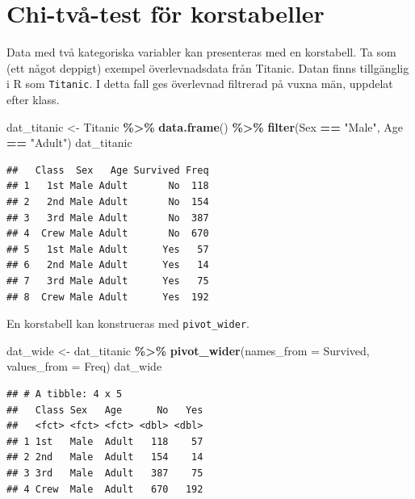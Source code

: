 \documentclass[
]{book}
\newenvironment{Shaded}{\begin{snugshade}}{\end{snugshade}}
\newcommand{\AttributeTok}[1]{\textcolor[rgb]{0.13,0.29,0.53}{#1}}
\newcommand{\FunctionTok}[1]{\textcolor[rgb]{0.13,0.29,0.53}{\textbf{#1}}}
\newcommand{\NormalTok}[1]{#1}
\newcommand{\OtherTok}[1]{\textcolor[rgb]{0.56,0.35,0.01}{#1}}
\newcommand{\SpecialCharTok}[1]{\textcolor[rgb]{0.81,0.36,0.00}{\textbf{#1}}}
\newcommand{\StringTok}[1]{\textcolor[rgb]{0.31,0.60,0.02}{#1}}
\theoremstyle{definition}
\theoremstyle{definition}
\theoremstyle{definition}
\theoremstyle{definition}
\theoremstyle{remark}
\begin{document}
\section{Chi-två-test för korstabeller}\label{chi-tvuxe5-test-fuxf6r-korstabeller}

Data med två kategoriska variabler kan presenteras med en korstabell. Ta som (ett något deppigt) exempel överlevnadsdata från Titanic. Datan finns tillgänglig i R som \texttt{Titanic}. I detta fall ges överlevnad filtrerad på vuxna män, uppdelat efter klass.

\begin{Shaded}
\begin{Highlighting}[]
\NormalTok{dat\_titanic }\OtherTok{\textless{}{-}}\NormalTok{ Titanic }\SpecialCharTok{\%\textgreater{}\%} \FunctionTok{data.frame}\NormalTok{() }\SpecialCharTok{\%\textgreater{}\%} \FunctionTok{filter}\NormalTok{(Sex }\SpecialCharTok{==} \StringTok{"Male"}\NormalTok{, Age }\SpecialCharTok{==} \StringTok{"Adult"}\NormalTok{)}
\NormalTok{dat\_titanic}
\end{Highlighting}
\end{Shaded}

\begin{verbatim}
##   Class  Sex   Age Survived Freq
## 1   1st Male Adult       No  118
## 2   2nd Male Adult       No  154
## 3   3rd Male Adult       No  387
## 4  Crew Male Adult       No  670
## 5   1st Male Adult      Yes   57
## 6   2nd Male Adult      Yes   14
## 7   3rd Male Adult      Yes   75
## 8  Crew Male Adult      Yes  192
\end{verbatim}

En korstabell kan konstrueras med \texttt{pivot\_wider}.

\begin{Shaded}
\begin{Highlighting}[]
\NormalTok{dat\_wide }\OtherTok{\textless{}{-}}\NormalTok{ dat\_titanic }\SpecialCharTok{\%\textgreater{}\%} 
  \FunctionTok{pivot\_wider}\NormalTok{(}\AttributeTok{names\_from =}\NormalTok{ Survived, }\AttributeTok{values\_from =}\NormalTok{ Freq)}
\NormalTok{dat\_wide}
\end{Highlighting}
\end{Shaded}

\begin{verbatim}
## # A tibble: 4 x 5
##   Class Sex   Age      No   Yes
##   <fct> <fct> <fct> <dbl> <dbl>
## 1 1st   Male  Adult   118    57
## 2 2nd   Male  Adult   154    14
## 3 3rd   Male  Adult   387    75
## 4 Crew  Male  Adult   670   192
\end{verbatim}
\end{document}
